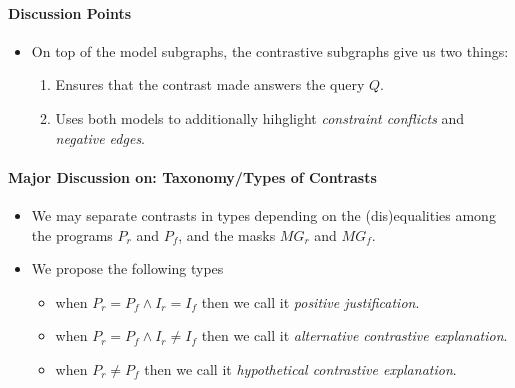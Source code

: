 


\paragraph{Discussion Points}
\begin{itemize}
  \item On top of the model subgraphs, the contrastive subgraphs give us two things:
  \begin{enumerate}
    \item Ensures that the contrast made answers the query $Q$.
    \item Uses both models to additionally hihglight \emph{constraint conflicts} and \emph{negative edges}.
  \end{enumerate}
\end{itemize}

\paragraph{Major Discussion on: Taxonomy/Types of Contrasts}
\begin{itemize}
  \item We may separate contrasts in types depending on the (dis)equalities among the programs $P_r$ and $P_f$, and the masks $MG_r$ and $MG_f$.
  \item We propose the following types
  \begin{itemize}
    \item when $P_r = P_f \land I_r = I_f$ then we call it \emph{positive justification}.
    \item when $P_r = P_f \land I_r \neq I_f$ then we call it \emph{alternative contrastive explanation}.
    \item when $P_r \neq P_f$ then we call it \emph{hypothetical contrastive explanation}.
  \end{itemize}
\end{itemize}



